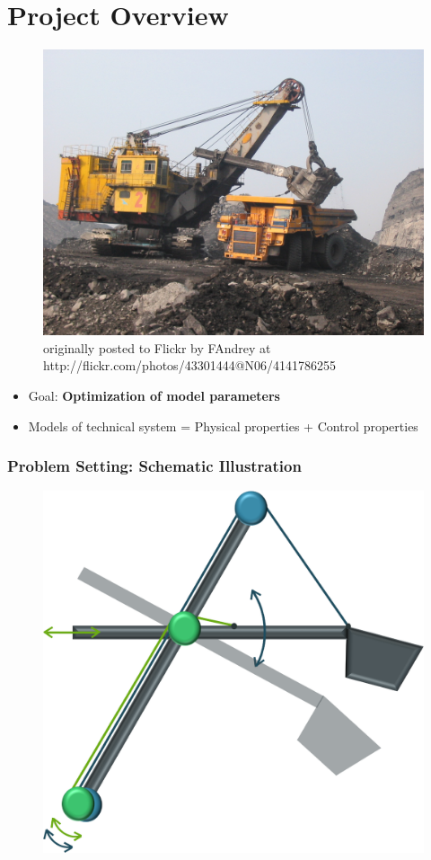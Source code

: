 \section{Project Overview}

\begin{frame}
	\begin{figure}[t]
		\centering
		\includegraphics[width=.6\linewidth]{img/Excavator} \\
		\tiny{originally posted to Flickr by FAndrey at http://flickr.com/photos/43301444@N06/4141786255}
	\end{figure}

	\begin{itemize}
		\item{Goal: \textbf{Optimization of model parameters}}
		\item{Models of technical system = Physical properties + Control properties}
	\end{itemize}
\end{frame}

\begin{frame}
	\frametitle{Problem Setting: Schematic Illustration}
	\begin{figure}[bth]
		\centering
		\includegraphics[width=.5\linewidth]{img/Problem_1}
	\end{figure}
\end{frame}

